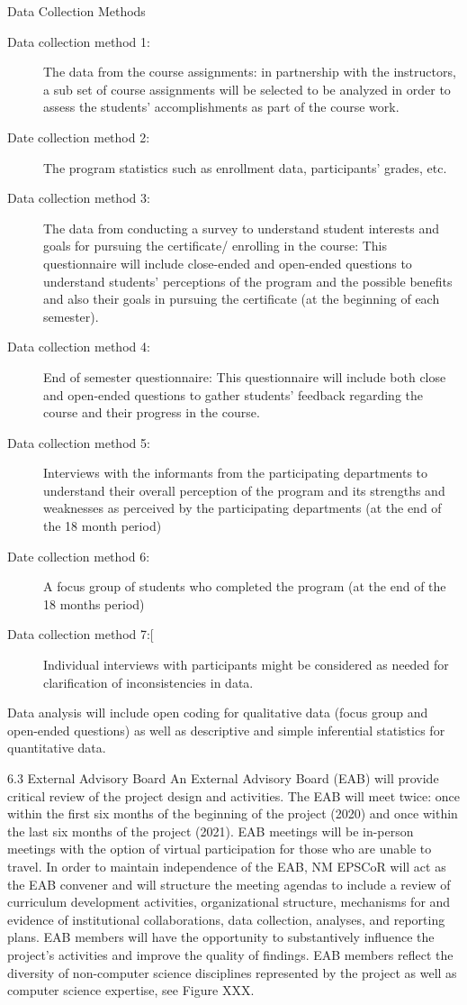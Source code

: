 Data Collection Methods
\begin{description}

\item[Data collection method 1:] The data from the course assignments: in partnership with the instructors, a sub set of course assignments will be selected to be analyzed in order to assess the students’ accomplishments as part of the course work. 
\item[Date collection method 2:] The program statistics such as enrollment data, participants’ grades, etc. 
\item[Data collection method 3:] The data from conducting a survey to understand student interests and goals for pursuing the certificate/ enrolling in the course: This questionnaire will include close-ended and open-ended questions to understand students’ perceptions of the program and the possible benefits and also their goals in pursuing the certificate (at the beginning of each semester). 
\item[Data collection method 4:] End of semester questionnaire: This questionnaire will include both close and open-ended questions to gather students’ feedback regarding the course and their progress in the course. 
\item[Data collection method 5:] Interviews with the informants from the participating departments to understand their overall perception of the program and its strengths and weaknesses as perceived by the participating departments (at the end of the 18 month period) 
\item[Date collection method 6:] A focus group of students who completed the program (at the end of the 18 months period) 
\item[Data collection method 7:[] Individual interviews with participants might be considered as needed for clarification of inconsistencies in data. 
\end{description}
Data analysis will include open coding for qualitative data (focus group and open-ended questions) as well as descriptive and simple inferential statistics for quantitative data.  

6.3 External Advisory Board
An External Advisory Board (EAB) will provide critical review of the project design and activities. The EAB will meet twice: once within the first six months of the beginning of the project (2020) and once within the last six months of the project (2021). EAB meetings will be in-person meetings with the option of virtual participation for those who are unable to travel. In order to maintain independence of the EAB, NM EPSCoR will act as the EAB convener and will structure the meeting agendas to include a review of curriculum development activities, organizational structure, mechanisms for and evidence of institutional collaborations, data collection, analyses, and reporting plans. EAB members will have the opportunity to substantively influence the project’s activities and improve the quality of findings. EAB members reflect the diversity of non-computer science disciplines represented by the project as well as computer science expertise, see Figure XXX.
